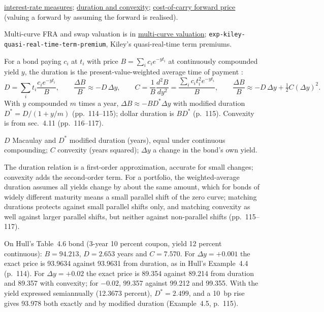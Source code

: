 \begin{qfmodel}
 \hyperref[def:interest-rate-measures]{interest-rate measures}; \hyperref[mod:duration-convexity]{duration and convexity}; \hyperref[res:cost-of-carry-forward-price]{cost-of-carry forward price} (valuing a forward by assuming the forward is realised).

 Multi-curve FRA and swap valuation is in \hyperref[mod:multi-curve-fra-swap-valuation]{multi-curve valuation}; \nolinkurl{exp-kiley-quasi-real-time-term-premium}, Kiley's quasi-real-time term premiums.

\end{qfmodel}

\begin{qfmodel}\label{mod:duration-convexity}
 For a bond paying $c_i$ at $t_i$ with price $B=\sum_ic_ie^{-yt_i}$ at continuously compounded yield $y$, the duration is the present-value-weighted average time of payment \citep[chap.~4, ``Interest Rates'', sec.~4.10, pp.~112--115, eqs.~(4.7)--(4.13)]{s7-hulloptions}:
\[ D=\sum_i t_i\frac{c_ie^{-yt_i}}{B},\qquad \frac{\Delta B}{B}\approx-D\,\Delta y,\qquad C=\frac1B\frac{d^2B}{dy^2}=\frac{\sum_ic_it_i^2e^{-yt_i}}{B},\qquad \frac{\Delta B}{B}\approx-D\,\Delta y+\tfrac12C(\Delta y)^2. \]
With $y$ compounded $m$ times a year, $\Delta B\approx-BD^*\Delta y$ with modified duration $D^*=D/(1+y/m)$ (pp.~114--115); dollar duration is $BD^*$ (p.~115). Convexity is from sec.~4.11 (pp.~116--117).

 $D$ Macaulay and $D^*$ modified duration (years), equal under continuous compounding; $C$ convexity (years squared); $\Delta y$ a change in the bond's own yield.

 The duration relation is a first-order approximation, accurate for small changes; convexity adds the second-order term. For a portfolio, the weighted-average duration assumes all yields change by about the same amount, which for bonds of widely different maturity means a small parallel shift of the zero curve; matching durations protects against small parallel shifts only, and matching convexity as well against larger parallel shifts, but neither against non-parallel shifts (pp.~115--117).

 On Hull's Table~4.6 bond (3-year 10 percent coupon, yield 12 percent continuous): $B=94.213$, $D=2.653$ years and $C=7.570$. For $\Delta y=+0.001$ the exact price is 93.9634 against 93.9631 from duration, as in Hull's Example~4.4 (p.~114). For $\Delta y=+0.02$ the exact price is 89.354 against 89.214 from duration and 89.357 with convexity; for $-0.02$, 99.357 against 99.212 and 99.355. With the yield expressed semiannually (12.3673 percent), $D^*=2.499$, and a 10~bp rise gives 93.978 both exactly and by modified duration (Example~4.5, p.~115).


\end{qfmodel}
